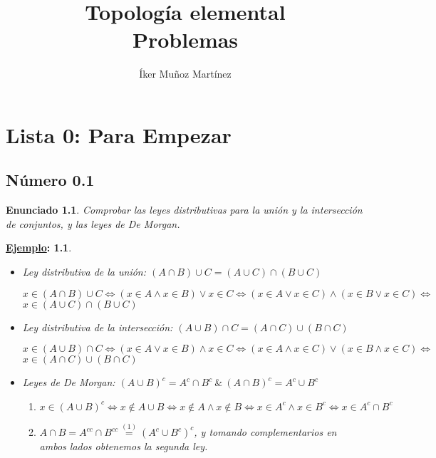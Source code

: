 \documentclass[10pt,a4paper,openright]{book}
\title{Topología elemental \\ Problemas}
\author{Íker Muñoz Martínez}
\date{}
\theoremstyle{break}
\newtheorem*{enun}{Enunciado}
\newtheorem*{ej}{\underline{Ejemplo}:}
\begin{document}
\frontmatter
\maketitle
\setcounter{tocdepth}{3}%
\tableofcontents

\mainmatter
\chapter{Lista 0: Para Empezar}%
\label{cha:lista0}

\section{Número 0.1}
\begin{enun}
Comprobar las leyes distributivas para la unión y la intersección de conjuntos, y las leyes de De Morgan.
\end{enun}
\begin{ej}
\begin{itemize}
\item Ley distributiva de la unión: $(A \cap B) \cup C = (A \cup C) \cap (B \cup C)$

$x \in (A \cap B) \cup C \Leftrightarrow (x \in A \wedge x \in B) \vee x \in C \Leftrightarrow (x \in A \vee x \in C) \wedge (x \in B \vee x \in C) \Leftrightarrow$ $x \in (A \cup C) \cap (B \cup C)$
\item Ley distributiva de la intersección: $(A \cup B) \cap C = (A \cap C) \cup (B \cap C)$

$x \in (A \cup B) \cap C \Leftrightarrow (x \in A \vee x \in B) \wedge x \in C \Leftrightarrow (x \in A \wedge x \in C) \vee (x \in B \wedge x \in C) \Leftrightarrow$ $x \in (A \cap C) \cup (B \cap C)$
\item Leyes de De Morgan: $(A \cup B)^c = A^c \cap B^c \ \& \ (A \cap B)^c = A^c \cup B^c$
\begin{enumerate}[label={(\arabic*)}]
\item $x \in (A \cup B)^c \Leftrightarrow x \notin A \cup B \Leftrightarrow x \notin A \wedge x \notin B \Leftrightarrow x \in A^c \wedge x \in B^c \Leftrightarrow x \in A^c \cap B^c$
\item $A \cap B = A^{cc} \cap B^{cc} \overset{(1)}{=} (A^c \cup B^c)^c$, y tomando complementarios en ambos lados obtenemos la segunda ley.
\end{enumerate}
\end{itemize}
\end{ej}
\end{document}
